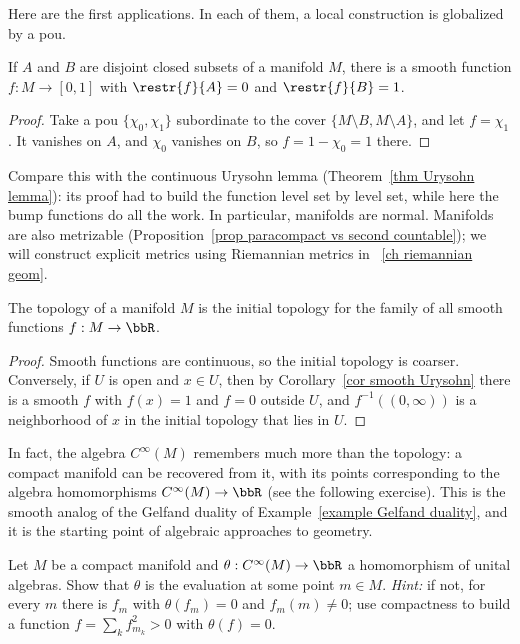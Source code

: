 Here are the first applications. In each of them, a local construction is globalized by a \gls{pou}.

\begin{cor}\label{cor smooth Urysohn}
    If $A$ and $B$ are disjoint closed subsets of a manifold $M$, there is a smooth function $f:M\to[0,1]$ with $\restr{f}{A}=0$ and $\restr{f}{B}=1$.
\end{cor}
\begin{proof}
    Take a \gls{pou} $\{\chi_0,\chi_1\}$ subordinate to the cover $\{M\setminus B,M\setminus A\}$, and let $f=\chi_1$. It vanishes on $A$, and $\chi_0$ vanishes on $B$, so $f=1-\chi_0=1$ there.
\end{proof}
Compare this with the continuous Urysohn lemma (Theorem~\ref{thm Urysohn lemma}): its proof had to build the function level set by level set, while here the bump functions do all the work. In particular, manifolds are normal. Manifolds are also metrizable (Proposition~\ref{prop paracompact vs second countable}); we will construct explicit metrics using Riemannian metrics in \Chap~\ref{ch riemannian geom}.

\begin{cor}\label{cor smooth functions determine topology}
    The topology of a manifold $M$ is the initial topology for the family of all smooth functions $f:M\to\bbR$.
\end{cor}
\begin{proof}
    Smooth functions are continuous, so the initial topology is coarser. Conversely, if $U$ is open and $x\in U$, then by Corollary~\ref{cor smooth Urysohn} there is a smooth $f$ with $f(x)=1$ and $f=0$ outside $U$, and $f^{-1}((0,\infty))$ is a neighborhood of $x$ in the initial topology that lies in $U$.
\end{proof}

\begin{rem}
    In fact, the algebra $C^\infty(M)$ remembers much more than the topology: a compact manifold can be recovered from it, with its points corresponding to the algebra homomorphisms $C^\infty(M)\to\bbR$ (see the following exercise). This is the smooth analog of the Gelfand duality of Example~\ref{example Gelfand duality}, and it is the starting point of algebraic approaches to geometry.
\end{rem}

\begin{xca}
    Let $M$ be a compact manifold and $\theta:C^\infty(M)\to\bbR$ a homomorphism of unital algebras. Show that $\theta$ is the evaluation at some point $m\in M$. \emph{Hint:} if not, for every $m$ there is $f_m$ with $\theta(f_m)=0$ and $f_m(m)\neq0$; use compactness to build a function $f=\sum_kf_{m_k}^2>0$ with $\theta(f)=0$.
\end{xca}

